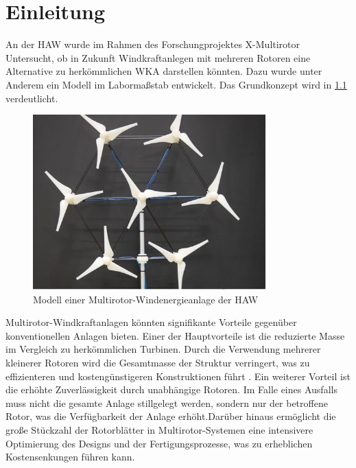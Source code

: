 \chapter{Einleitung}


An der HAW wurde im Rahmen des Forschungprojektes X-Multirotor Untersucht, ob in Zukunft Windkraftanlegen mit mehreren Rotoren eine Alternative zu herkömmlichen WKA darstellen könnten. Dazu wurde unter Anderem ein Modell im Labormaßstab entwickelt. Das Grundkonzept wird in \ref{fig:multirotor} verdeutlicht.

\begin{figure}[htbp] %
    \centering %
    \includegraphics[width=0.8\textwidth]{figures/multirotor.jpg} %
    \caption{Modell einer Multirotor-Windenergieanlage der HAW \cite{fink_multirotorjpg_2018}} %
    \label{fig:multirotor} %
\end{figure}

Multirotor-Windkraftanlagen könnten signifikante Vorteile gegenüber konventionellen Anlagen bieten. Einer der Hauptvorteile ist die reduzierte Masse im Vergleich zu herkömmlichen Turbinen. Durch die Verwendung mehrerer kleinerer Rotoren wird die Gesamtmasse der Struktur verringert, was zu effizienteren und kostengünstigeren Konstruktionen führt \cite{jamieson_multi-rotors_2012}. Ein weiterer Vorteil ist die erhöhte Zuverlässigkeit durch unabhängige Rotoren. Im Falle eines Ausfalls muss nicht die gesamte Anlage stillgelegt werden, sondern nur der betroffene Rotor, was die Verfügbarkeit der Anlage erhöht.Darüber hinaus ermöglicht die große Stückzahl der Rotorblätter in Multirotor-Systemen eine intensivere Optimierung des Designs und der Fertigungsprozesse, was zu erheblichen Kostensenkungen führen kann.


